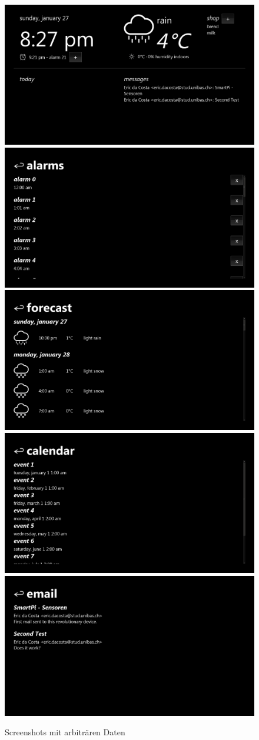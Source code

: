 \documentclass[11pt,a4paper]{article}
\begin{document}
\begin{figure}[H]
\includegraphics[width=1\textwidth]{images/home.png}
\includegraphics[width=.5\textwidth]{images/alarms.png}
\includegraphics[width=.5\textwidth]{images/forecast.png}
\includegraphics[width=.5\textwidth]{images/calendar.png}
\includegraphics[width=.5\textwidth]{images/email.png}
\caption{Screenshots mit arbiträren Daten}
\end{figure}
\end{document}
